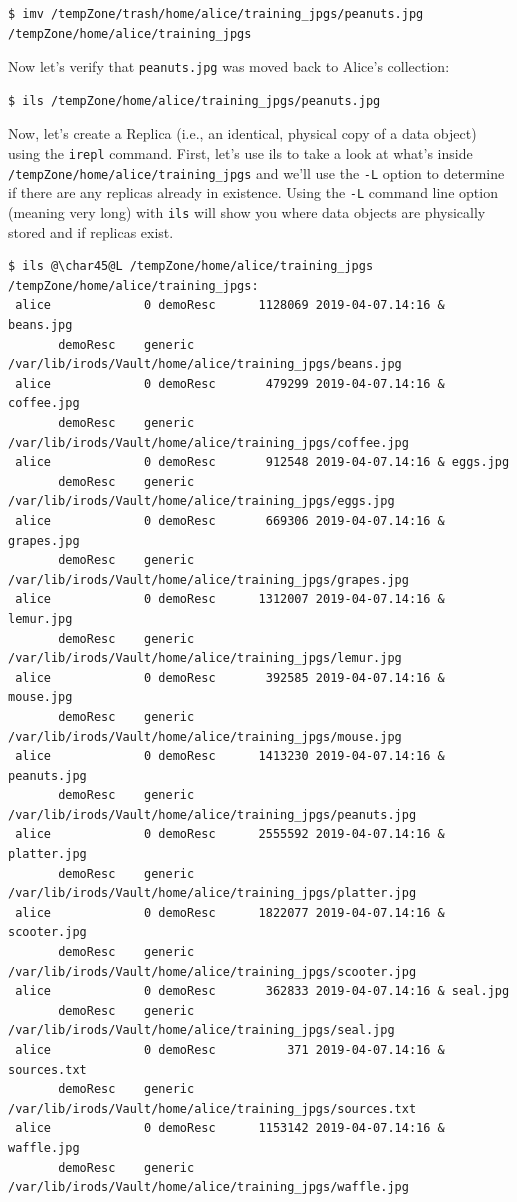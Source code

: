 \documentclass[10pt,oneside]{memoir}
\begin{document}
\begin{lstlisting}[basicstyle=\tiny\ttfamily]
$ imv /tempZone/trash/home/alice/training_jpgs/peanuts.jpg /tempZone/home/alice/training_jpgs
\end{lstlisting}

Now let's verify that \texttt{peanuts.jpg} was moved back to Alice's collection:

\begin{lstlisting}
$ ils /tempZone/home/alice/training_jpgs/peanuts.jpg
\end{lstlisting}

\newpage

Now, let's create a Replica (i.e., an identical, physical copy of a data object) using the \texttt{irepl} command. First, let's use ils to take a look at what's inside \texttt{/tempZone/home/alice/training\_jpgs} and we'll use the \texttt{-L} option to determine if there are any replicas already in existence. Using the \texttt{-L} command line option (meaning very long) with \texttt{ils} will show you where data objects are physically stored and if replicas exist.

\begin{lstlisting}[basicstyle=\tiny\ttfamily]
$ ils @\char45@L /tempZone/home/alice/training_jpgs
/tempZone/home/alice/training_jpgs:
 alice             0 demoResc      1128069 2019-04-07.14:16 & beans.jpg
       demoResc    generic    /var/lib/irods/Vault/home/alice/training_jpgs/beans.jpg
 alice             0 demoResc       479299 2019-04-07.14:16 & coffee.jpg
       demoResc    generic    /var/lib/irods/Vault/home/alice/training_jpgs/coffee.jpg
 alice             0 demoResc       912548 2019-04-07.14:16 & eggs.jpg
       demoResc    generic    /var/lib/irods/Vault/home/alice/training_jpgs/eggs.jpg
 alice             0 demoResc       669306 2019-04-07.14:16 & grapes.jpg
       demoResc    generic    /var/lib/irods/Vault/home/alice/training_jpgs/grapes.jpg
 alice             0 demoResc      1312007 2019-04-07.14:16 & lemur.jpg
       demoResc    generic    /var/lib/irods/Vault/home/alice/training_jpgs/lemur.jpg
 alice             0 demoResc       392585 2019-04-07.14:16 & mouse.jpg
       demoResc    generic    /var/lib/irods/Vault/home/alice/training_jpgs/mouse.jpg
 alice             0 demoResc      1413230 2019-04-07.14:16 & peanuts.jpg
       demoResc    generic    /var/lib/irods/Vault/home/alice/training_jpgs/peanuts.jpg
 alice             0 demoResc      2555592 2019-04-07.14:16 & platter.jpg
       demoResc    generic    /var/lib/irods/Vault/home/alice/training_jpgs/platter.jpg
 alice             0 demoResc      1822077 2019-04-07.14:16 & scooter.jpg
       demoResc    generic    /var/lib/irods/Vault/home/alice/training_jpgs/scooter.jpg
 alice             0 demoResc       362833 2019-04-07.14:16 & seal.jpg
       demoResc    generic    /var/lib/irods/Vault/home/alice/training_jpgs/seal.jpg
 alice             0 demoResc          371 2019-04-07.14:16 & sources.txt
       demoResc    generic    /var/lib/irods/Vault/home/alice/training_jpgs/sources.txt
 alice             0 demoResc      1153142 2019-04-07.14:16 & waffle.jpg
       demoResc    generic    /var/lib/irods/Vault/home/alice/training_jpgs/waffle.jpg
\end{lstlisting}
\end{document}
